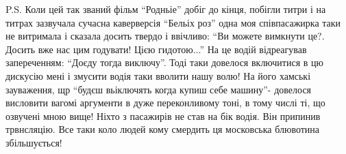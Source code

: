 P.S. Коли цей так званий фільм \enquote{Родньіе}  добіг до кінця, побігли титри і на
титрах зазвучала сучасна каверверсія \enquote{Бельіх роз} одна моя співпасажирка таки
не витримала і сказала досить твердо і ввічливо: \enquote{Ви можете вимкнути
це?. Досить вже нас цим годувати! Цією гидотою...} На це водій відреагував
запереченням: \enquote{Доєду тогда виключу}. Тоді таки довелося включитися в цю
дискусію мені і змусити водія таки вволити нашу волю! На його хамські
зауваження, щр \enquote{будєш вьіключять когда купиш себе машину}- довелося висловити
вагомі аргументи в дуже переконливому тоні, в тому числі ті, що озвучені мною
вище! Ніхто з пасажирів не став на бік водія. Він припинив трвнсляцію. Все таки
коло людей кому смердить ця московська блювотина збільшується!

